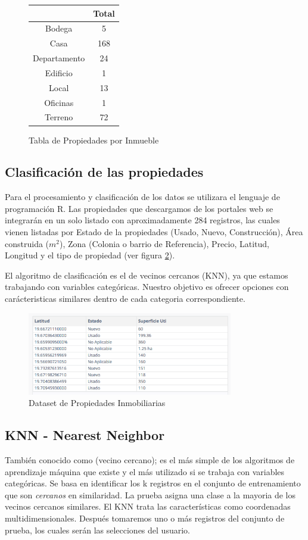 \begin{figure}[ht]
\centering
\begin{tabular}{cc}
  \hline
 & Total \\ 
  \hline
Bodega &   5 \\ 
  Casa & 168 \\ 
  Departamento &  24 \\ 
  Edificio &   1 \\ 
  Local &  13 \\ 
  Oficinas &   1 \\ 
  Terreno &  72 \\ 
   \hline
\end{tabular}
\caption{Tabla de Propiedades por Inmueble}
\label{fig:PropiedadesList}
\end{figure}

\subsection{Clasificación de las propiedades}
Para el procesamiento y clasificación de los datos se utilizara el lenguaje de programación R. Las propiedades que descargamos de los portales web se integrarán en un solo listado con aproximadamente 284 registros, las cuales  vienen listadas por Estado de la propiedades (Usado, Nuevo, Construcción), Área construida ($m^2$), Zona (Colonia o barrio de Referencia), Precio, Latitud, Longitud y el tipo de propiedad (ver figura \ref{fig:Dataset}). 


El algoritmo de clasificación es el de vecinos cercanos (KNN), ya que estamos trabajando con variables categóricas. Nuestro objetivo es ofrecer opciones con carácteristicas similares dentro de cada categoria correspondiente.
\begin{figure}[ht]
\centering
\includegraphics[width=0.8\textwidth]{Dataset.png}
\caption{Dataset de Propiedades Inmobiliarias}
\label{fig:Dataset}
\end{figure}


\subsection{KNN - Nearest Neighbor}
También conocido como (vecino cercano); es el más simple de los algoritmos de aprendizaje máquina que existe y el más utilizado si se trabaja con variables categóricas. Se basa en identificar los k  registros en el conjunto de entrenamiento que son \emph{cercanos} en similaridad. La prueba asigna una clase a la mayoria de los vecinos cercanos similares. El KNN trata las características como coordenadas multidimensionales. Después tomaremos uno o más registros del conjunto de prueba, los cuales serán las selecciones del usuario. 

